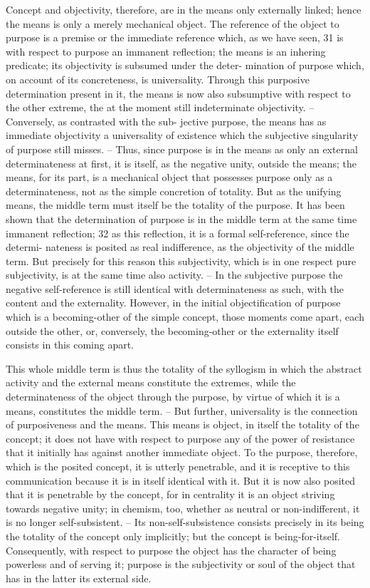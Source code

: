 Concept and objectivity, therefore, are in the means only externally
linked; hence the means is only a merely mechanical object. The reference
of the object to purpose is a premise or the immediate reference which,
as we have seen, 31 is with respect to purpose an immanent reflection; the
means is an inhering predicate; its objectivity is subsumed under the deter-
mination of purpose which, on account of its concreteness, is universality.
Through this purposive determination present in it, the means is now
also subsumptive with respect to the other extreme, the at the moment
still indeterminate objectivity. – Conversely, as contrasted with the sub-
jective purpose, the means has as immediate objectivity a universality of
existence which the subjective singularity of purpose still misses. – Thus,
since purpose is in the means as only an external determinateness at first, it
is itself, as the negative unity, outside the means; the means, for its part, is
a mechanical object that possesses purpose only as a determinateness, not
as the simple concretion of totality. But as the unifying means, the middle
term must itself be the totality of the purpose. It has been shown that the
determination of purpose is in the middle term at the same time immanent
reflection; 32 as this reflection, it is a formal self-reference, since the determi-
nateness is posited as real indifference, as the objectivity of the middle term.
But precisely for this reason this subjectivity, which is in one respect pure
subjectivity, is at the same time also activity. – In the subjective purpose the
negative self-reference is still identical with determinateness as such, with
the content and the externality. However, in the initial objectification of
purpose which is a becoming-other of the simple concept, those moments
come apart, each outside the other, or, conversely, the becoming-other or
the externality itself consists in this coming apart.

This whole middle term is thus the totality of the syllogism in which
the abstract activity and the external means constitute the extremes, while
the determinateness of the object through the purpose, by virtue of which
it is a means, constitutes the middle term. – But further, universality is the
connection of purposiveness and the means. This means is object, in itself
the totality of the concept; it does not have with respect to purpose any
of the power of resistance that it initially has against another immediate
object. To the purpose, therefore, which is the posited concept, it is utterly
penetrable, and it is receptive to this communication because it is in itself
identical with it. But it is now also posited that it is penetrable by the
concept, for in centrality it is an object striving towards negative unity;
in chemism, too, whether as neutral or non-indifferent, it is no longer
self-subsistent. – Its non-self-subsistence consists precisely in its being the
totality of the concept only implicitly; but the concept is being-for-itself.
Consequently, with respect to purpose the object has the character of being
powerless and of serving it; purpose is the subjectivity or soul of the object
that has in the latter its external side.

